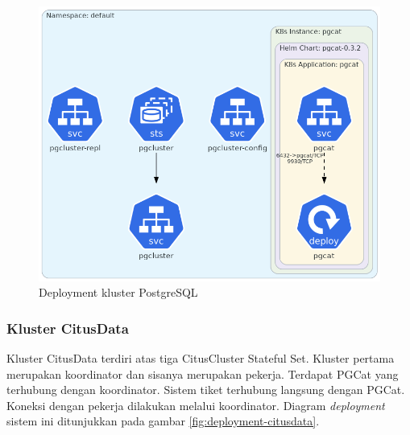 \begin{figure}[htbp]
    \centering
    \includegraphics[width=1\textwidth]{resources/chapter-4/postgres.png}
    \caption{Deployment kluster PostgreSQL}
    \label{fig:deployment-postgres}
\end{figure}


\pagebreak

\subsubsection{Kluster CitusData}

Kluster CitusData terdiri atas tiga CitusCluster Stateful Set. Kluster pertama merupakan koordinator dan sisanya merupakan pekerja. Terdapat PGCat yang terhubung dengan koordinator. Sistem tiket terhubung langsung dengan PGCat. Koneksi dengan pekerja dilakukan melalui koordinator. Diagram \textit{deployment} sistem ini ditunjukkan pada gambar \ref{fig:deployment-citusdata}.

